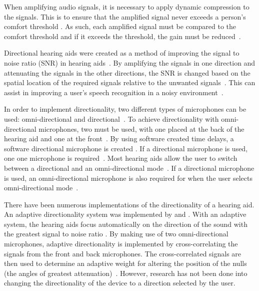 \documentclass[10pt,twocolumn]{witseiepaper}
\begin{document}
When amplifying audio signals, it is necessary to apply dynamic compression to the signals. This is to ensure that the amplified signal never exceeds a person's comfort threshold \cite{Complexity_effective_auditory_compensation, Loudness_compensation_method_based_on_human_auditory}. As such, each amplified signal must be compared to the comfort threshold and if it exceeds the threshold, the gain must be reduced~\cite{Complexity_effective_auditory_compensation}.

Directional hearing aids were created as a method of improving the signal to noise ratio (SNR) in hearing aids~\cite{trends_in_amplification}. By amplifying the signals in one direction and attenuating the signals in the other directions, the SNR is changed based on the spatial location of the required signals relative to the unwanted signals~\cite{trends_in_amplification}. This can assist in improving a user's speech recognition in a noisy environment~\cite{trends_in_amplification}. 
 
In order to implement directionality, two different types of microphones can be used: omni-directional and directional~\cite{An_ultra_low_power_analogue_directionality, trends_in_amplification}. To achieve directionality with omni-directional microphones, two must be used, with one placed at the back of the hearing aid and one at the front~\cite{An_ultra_low_power_analogue_directionality, trends_in_amplification}. By using software created time delays, a software directional microphone is created \cite{Distortion_of_interaural_time_cues}. If a directional microphone is used, one one microphone is required~\cite{trends_in_amplification}. Most hearing aids allow the user to switch between a directional and an omni-directional mode~\cite{trends_in_amplification}. If a directional microphone is used, an omni-directional microphone is also required for when the user selects omni-directional mode~\cite{trends_in_amplification}.

There have been numerous implementations of the directionality of a hearing aid. An adaptive directionality system was implemented by \cite{An_ultra_low_power_analogue_directionality} and \cite{Evaluation_of_digital_hearing_aid_algorithms}. With an adaptive system, the hearing aids focus automatically on the direction of the sound with the greatest signal to noise ratio \cite{An_ultra_low_power_analogue_directionality}. By making use of two omni-directional microphones, adaptive directionality is implemented by cross-correlating the signals from the front and back microphones. The cross-correlated signals are then used to determine an adaptive weight for altering the position of the nulls (the angles of greatest attenuation)~\cite{An_ultra_low_power_analogue_directionality}. However, research has not been done into changing the directionality of the device to a direction selected by the user.
\end{document}
